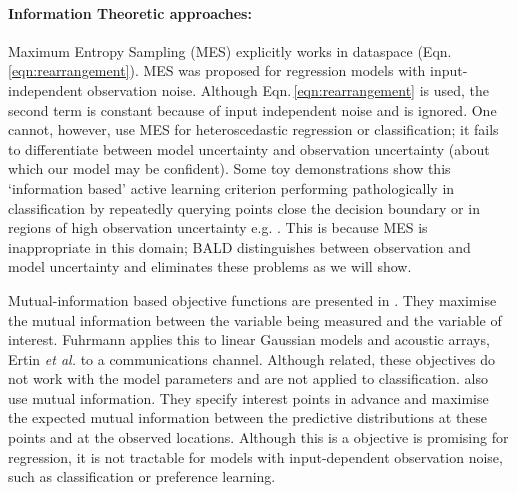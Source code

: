 \documentclass[twoside]{article}
\begin{document}
\paragraph{Information Theoretic approaches:} Maximum Entropy Sampling (MES) \cite{sebastiani2000} explicitly works in dataspace (Eqn.\,\eqref{eqn:rearrangement}). MES was proposed for regression models with input-independent observation noise. Although Eqn.\,\eqref{eqn:rearrangement} is used, the second term is constant because of input independent noise and is ignored. One cannot, however, use MES for heteroscedastic regression or classification; it fails to differentiate between model uncertainty and observation uncertainty (about which our model may be confident). Some toy demonstrations show this `information based' active learning criterion performing pathologically in classification by repeatedly querying points close the decision boundary or in regions of high observation uncertainty  e.g. \cite{huang2010}. This is because MES is inappropriate in this domain; BALD distinguishes between observation and model uncertainty and eliminates these problems as we will show.

Mutual-information based objective functions are presented in \cite{ertin2003,fuhrmann2003}. They maximise the mutual information between the variable being measured and the variable of interest. Fuhrmann \cite{fuhrmann2003} applies this to linear Gaussian models and acoustic arrays, Ertin \emph{et al.} \cite{ertin2003} to a communications channel. Although related, these objectives do not work with the model parameters and are not applied to classification. \cite{guestrin2005, krause2006} also use mutual information. They specify interest points in advance and maximise the expected mutual information between the predictive distributions at these points and at the observed locations. Although this is a objective is promising for regression, it is not tractable for models with input-dependent observation noise, such as classification or preference learning.

\end{document}
